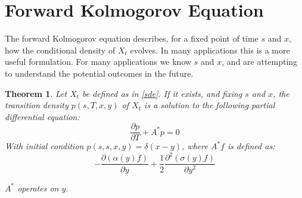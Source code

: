 \documentclass{article}
\newtheorem{theorem}{Theorem}
\theoremstyle{definition}
\begin{document}
\section{Forward Kolmogorov Equation}

The forward Kolmogorov equation describes, for a fixed point of time \(s\) and \(x\), how the conditional density of \(X_t\) evolves.  In many applications this is a more useful formulation.  For many applications we know \(s\) and \(x\), and are attempting to understand the potential outcomes in the future.  

\begin{theorem}\label{forwardk}
	Let \(X_t\) be defined as in \ref{sde}.  If it exists, and fixing \(s\) and \(x\), the transition density \(p(s, T, x, y)\) of \(X_t\) is a solution to the following partial differential equation:
	\[\frac{\partial p}{\partial T} + A^*p=0 \]
	With initial condition \(p(s, s, x, y)=\delta(x-y)\), where \(A^*f\) is defined as: \[-\frac{\partial \left(\alpha(y) f\right)}{\partial y} + \frac{1}{2}\frac{\partial^2 \left(\sigma(y) f\right) } {\partial y^2}   \]
	
	\(A^*\) operates on \(y\).
\end{theorem}
\end{document}
